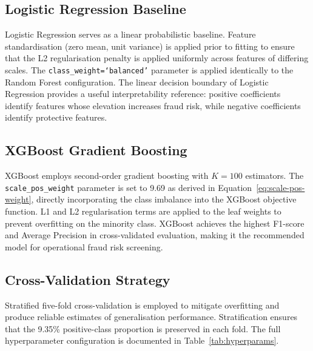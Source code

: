 \subsection{Logistic Regression Baseline}

Logistic Regression \cite{b13} serves as a linear probabilistic baseline. Feature standardisation (zero mean, unit variance) is applied prior to fitting to ensure that the L2 regularisation penalty is applied uniformly across features of differing scales. The \texttt{class\_weight=`balanced'} parameter is applied identically to the Random Forest configuration. The linear decision boundary of Logistic Regression provides a useful interpretability reference: positive coefficients identify features whose elevation increases fraud risk, while negative coefficients identify protective features.

\subsection{XGBoost Gradient Boosting}

XGBoost \cite{b12} employs second-order gradient boosting with $K=100$ estimators. The \texttt{scale\_pos\_weight} parameter is set to 9.69 as derived in Equation~\ref{eq:scale-pos-weight}, directly incorporating the class imbalance into the XGBoost objective function. L1 and L2 regularisation terms are applied to the leaf weights to prevent overfitting on the minority class. XGBoost achieves the highest F1-score and Average Precision in cross-validated evaluation, making it the recommended model for operational fraud risk screening.

\subsection{Cross-Validation Strategy}

Stratified five-fold cross-validation is employed to mitigate overfitting and produce reliable estimates of generalisation performance. Stratification ensures that the 9.35\% positive-class proportion is preserved in each fold. The full hyperparameter configuration is documented in Table~\ref{tab:hyperparams}.


